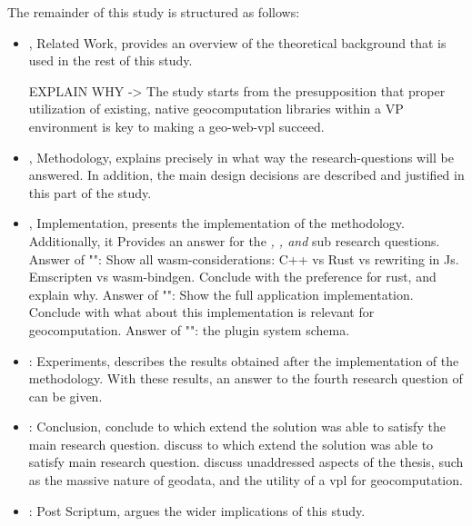The remainder of this study is structured as follows:
\begin{itemize}[ ]
  \item {}, Related Work, provides an overview of the theoretical background that is used in the rest of this study.
  
  \begin{note}
    EXPLAIN WHY -> The study starts from the presupposition that proper utilization of existing, native geocomputation libraries within a VP environment is key to making a geo-web-vpl succeed. 
  \end{note}


  \item {}, Methodology, explains precisely in what way the research-questions will be answered. In addition, the main design decisions are described and justified in this part of the study.

  \item {}, Implementation, presents the implementation of the methodology. Additionally, it Provides an answer for the \textit{\mySubRQOneTitle, \mySubRQTwoTitle , and \mySubRQThreeTitle} sub research questions. 
  \subitem Answer of "\mySubRQOneTitle": Show all wasm-considerations: C++ vs Rust vs rewriting in Js. Emscripten vs wasm-bindgen. Conclude with the preference for rust, and explain why.
  \subitem Answer of "\mySubRQTwoTitle": Show the full application implementation. Conclude with what about this implementation is relevant for geocomputation. 
  \subitem Answer of "\mySubRQThreeTitle": the plugin system schema. 
  
  \item {}: Experiments, describes the results obtained after the implementation of the methodology. With these results, an answer to the fourth research question of \mySubRQFourTitle can be given. 

  \item {}: Conclusion, 
  \subitem conclude to which extend the solution was able to satisfy the main research question. 
  \subitem discuss to which extend the solution was able to satisfy main research question.
  \subitem discuss unaddressed aspects of the thesis, such as the massive nature of geodata, and the utility of a vpl for geocomputation.

  \item {}: Post Scriptum, argues the wider implications of this study. 

\end{itemize}

